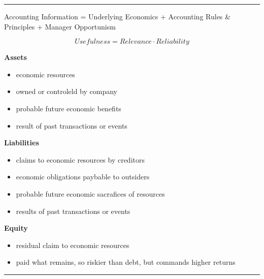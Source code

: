 \documentclass[8pt]{report}
\begin{document}
\hrule

\begin{multicols}{3}
Accounting Information = Underlying Economics + Accounting Rules \& Principles + Manager Opportunism

$$
	Usefulness = Relevance \cdot Reliability
$$

\textbf{Assets}
\begin{itemize}
	\item economic resources
	\item owned or controleld by company
	\item probable future economic benefits
	\item result of past transactions or events
\end{itemize}

\textbf{Liabilities}
\begin{itemize}
	\item claims to economic resources by creditors
	\item economic obligations paybable to outsiders
	\item probable future economic sacrafices of resources
	\item results of past transactions or events
\end{itemize}


\textbf{Equity}
\begin{itemize}
	\item residual claim to economic resources
	\item paid what remains, so riskier than debt, but commands higher returns
\end{itemize}
\end{multicols}

\hrule
\end{document}
